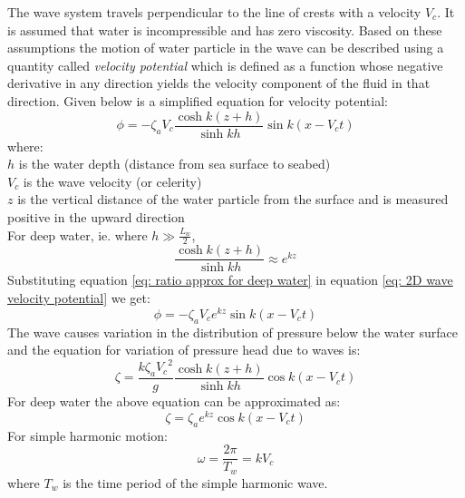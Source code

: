 The wave system travels perpendicular to the line of crests with a velocity
$V_c$. It is assumed that water is incompressible and has zero viscosity. Based
on these assumptions the motion of water particle in the wave can be described
using a quantity called \textit{velocity potential} which is defined as a function
whose negative derivative in any direction yields the velocity component of the
fluid in that direction. Given
below is a simplified equation for velocity potential:
\begin{equation}
  \phi = - \zeta_a V_c \frac{\cosh k(z + h)}{\sinh k h} \sin k(x - V_c t)
  \label {eq: 2D wave velocity potential}
\end{equation}
where:\\
$h$ is the water depth (distance from sea surface to seabed)\\ 
$V_c$ is the wave velocity (or celerity)\\ 
$z$ is the vertical distance of the water particle from the surface and is 
measured positive in the upward direction\\ 
For deep water, ie. where $h \gg \frac{L_w}{2}$, 
\begin{equation}
  \frac{\cosh k(z + h)}{\sinh k h} \approx e^{k z}
  \label{eq: ratio approx for deep water}
\end{equation}
Substituting equation \ref{eq: ratio approx for deep water} in equation 
\ref{eq: 2D wave velocity potential} we get:
\begin{equation}
  \phi = - \zeta_a V_c e^{k z} \sin k(x - V_c t)
  \label{eq: 2D wave velocity potential for deep water}
\end{equation}
The wave causes variation in the distribution of pressure below the water
surface and the equation for variation of pressure head due to waves is:
\begin{equation}
  \zeta = \frac{k \zeta_a {V_c}^2}{g} \frac{\cosh k(z + h)}{\sinh k h} \cos k(x
  - V_c t)
  \label{eq: pressure head variation}
\end{equation}
For deep water the above equation can be approximated as:
\begin{equation}
  \zeta = \zeta_a e^{k z} \cos k(x - V_c t)
  \label{eq: pressure head variation for deep water}
\end{equation}
For simple harmonic motion: 
\begin{equation}
  \omega = \frac{2 \pi}{T_w} = k V_c
  \label{eq: simple harmonic motion}
\end{equation}
where $T_w$ is the time period of the simple harmonic wave.\\
